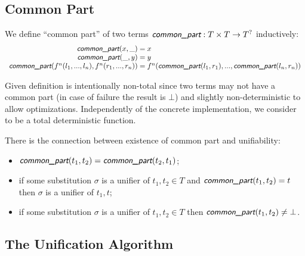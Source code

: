 \subsection{Common Part}

We define ``common part'' of two terms $\commonpart : T \times T \rightarrow T^?$ inductively:
\begin{equation*}
    \begin{array}{r@{{}={}}l}
        \commonpart(x, \_) & x \\
        \commonpart(\_, y) & y \\
        \commonpart(f^n(l_1, ..., l_n), f^n(r_1, ..., r_n)) & f^n(\commonpart(l_1, r_1), ..., \commonpart(l_n, r_n)) \\
    \end{array}
\end{equation*}

Given definition is intentionally non-total since two terms may not have a common part (in case of failure the result is $\bot$) and slightly non-deterministic to allow optimizations. Independently of the concrete implementation, we consider \commonpart to be a total deterministic function.

There is the connection between existence of common part and unifiability:
\begin{itemize}
    \item $\commonpart(t_1, t_2) = \commonpart(t_2, t_1)$;
    \item if some substitution $\sigma$ is a unifier of $t_1, t_2 \in T$ and $\commonpart(t_1, t_2) = t$ then $\sigma$ is a unifier of $t_1, t$;
    \item if some substitution $\sigma$ is a unifier of $t_1, t_2 \in T$ then $\commonpart(t_1, t_2) \neq \bot$.
\end{itemize}


\subsection{The Unification Algorithm}

